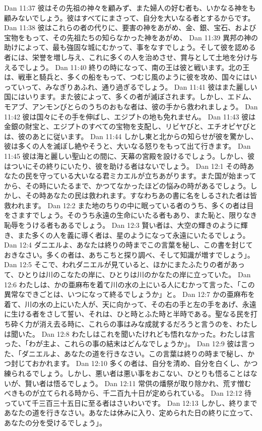 Dan 11:37  彼はその先祖の神々を顧みず、また婦人の好む者も、いかなる神をも顧みないでしょう。彼はすべてにまさって、自分を大いなる者とするからです。
Dan 11:38  彼はこれらの者の代りに、要害の神をあがめ、金、銀、宝石、および宝物をもって、その先祖たちの知らなかった神をあがめ、
Dan 11:39  異邦の神の助けによって、最も強固な城にむかって、事をなすでしょう。そして彼を認める者には、栄誉を増し与え、これに多くの人を治めさせ、賞与として土地を分け与えるでしょう。
Dan 11:40  終りの時になって、南の王は彼と戦います。北の王は、戦車と騎兵と、多くの船をもって、つむじ風のように彼を攻め、国々にはいっていって、みなぎりあふれ、通り過ぎるでしょう。
Dan 11:41  彼はまた麗しい国にはいります。また彼によって、多くの者が滅ぼされます。しかし、エドム、モアブ、アンモンびとらのうちのおもな者は、彼の手から救われましょう。
Dan 11:42  彼は国々にその手を伸ばし、エジプトの地も免れません。
Dan 11:43  彼は金銀の財宝と、エジプトのすべての宝物を支配し、リビヤびと、エチオピヤびとは、彼のあとに従います。
Dan 11:44  しかし東と北からの知らせが彼を驚かし、彼は多くの人を滅ぼし絶やそうと、大いなる怒りをもって出て行きます。
Dan 11:45  彼は海と麗しい聖山との間に、天幕の宮殿を設けるでしょう。しかし、彼はついにその終りにいたり、彼を助ける者はないでしょう。
Dan 12:1  その時あなたの民を守っている大いなる君ミカエルが立ちあがります。また国が始まってから、その時にいたるまで、かつてなかったほどの悩みの時があるでしょう。しかし、その時あなたの民は救われます。すなわちあの書に名をしるされた者は皆救われます。
Dan 12:2  また地のちりの中に眠っている者のうち、多くの者は目をさますでしょう。そのうち永遠の生命にいたる者もあり、また恥と、限りなき恥辱をうける者もあるでしょう。
Dan 12:3  賢い者は、大空の輝きのように輝き、また多くの人を義に導く者は、星のようになって永遠にいたるでしょう。
Dan 12:4  ダニエルよ、あなたは終りの時までこの言葉を秘し、この書を封じておきなさい。多くの者は、あちこちと探り調べ、そして知識が増すでしょう」。
Dan 12:5  そこで、われダニエルが見ていると、ほかにまたふたりの者があって、ひとりは川のこなたの岸に、ひとりは川のかなたの岸に立っていた。
Dan 12:6  わたしは、かの亜麻布を着て川の水の上にいる人にむかって言った、「この異常なできごとは、いつになって終るでしょうか」と。
Dan 12:7  かの亜麻布を着て、川の水の上にいた人が、天に向かって、その右の手と左の手をあげ、永遠に生ける者をさして誓い、それは、ひと時とふた時と半時である。聖なる民を打ち砕く力が消え去る時に、これらの事はみな成就するだろうと言うのを、わたしは聞いた。
Dan 12:8  わたしはこれを聞いたけれども悟れなかった。わたしは言った、「わが主よ、これらの事の結末はどんなでしょうか」。
Dan 12:9  彼は言った、「ダニエルよ、あなたの道を行きなさい。この言葉は終りの時まで秘し、かつ封じておかれます。
Dan 12:10  多くの者は、自分を清め、自分を白くし、かつ練られるでしょう。しかし、悪い者は悪い事をおこない、ひとりも悟ることはないが、賢い者は悟るでしょう。
Dan 12:11  常供の燔祭が取り除かれ、荒す憎むべきものが立てられる時から、千二百九十日が定められている。
Dan 12:12  待っていて千三百三十五日に至る者はさいわいです。
Dan 12:13  しかし、終りまであなたの道を行きなさい。あなたは休みに入り、定められた日の終りに立って、あなたの分を受けるでしょう」。


